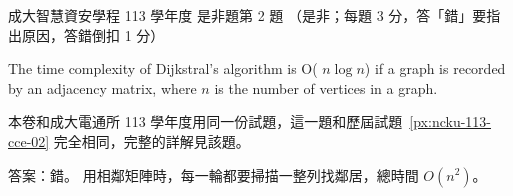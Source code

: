 \begin{pastexam}[label={px:ncku-113-isec-02}]{成大智慧資安學程 113 學年度 是非題第 2 題}
（是非；每題 3 分，答「錯」要指出原因，答錯倒扣 1 分）

The time complexity of Dijkstral's algorithm is O( $n\log n$) if a graph is recorded by an
adjacency matrix, where $n$ is the number of vertices in a graph.
\end{pastexam}

\begin{pastsoln}
本卷和成大電通所 113 學年度用同一份試題，這一題和歷屆試題~\ref{px:ncku-113-cce-02} 完全相同，完整的詳解見該題。

答案：錯。 用相鄰矩陣時，每一輪都要掃描一整列找鄰居，總時間 $O(n^2)$。
\end{pastsoln}
